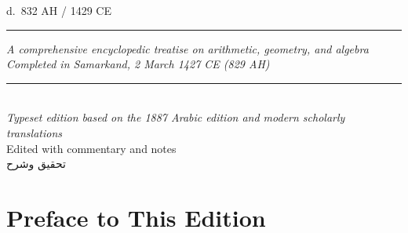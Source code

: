 \documentclass[11pt,a4paper]{article}
\newcommand{\longline}{\noindent\rule{\textwidth}{0.4pt}}
\newcommand{\shortline}{\noindent\rule{0.5\textwidth}{0.4pt}\par}
\newcommand{\ar}[1]{{\arabicfont\beginR #1\endR}}
\begin{document}
\begin{center}
{\normalsize d.\ 832 AH / 1429 CE}\\[1cm]



{\color{rulecolor}\shortline}



\vspace{0.5cm}



{\small\textit{A comprehensive encyclopedic treatise on arithmetic, geometry, and algebra}}\\[0.2cm]

{\small\textit{Completed in Samarkand, 2 March 1427 CE (829 AH)}}\\[0.5cm]



{\color{rulecolor}\longline}\\[1cm]



{\small\textit{Typeset edition based on the 1887 Arabic edition and modern scholarly translations}}\\[0.3cm]

{\small Edited with commentary and notes}\\[1cm]



{\footnotesize\ar{تحقيق وشرح}}\\[0.2cm]

\end{center}

\clearpage






\tableofcontents

\clearpage






\section*{Preface to This Edition}
\end{document}
